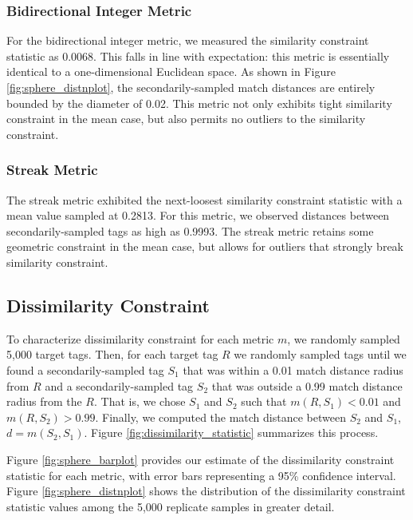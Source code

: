 \subsubsection{Bidirectional Integer Metric}

For the bidirectional integer metric, we measured the similarity constraint statistic as 0.0068.
This falls in line with expectation: this metric is essentially identical to a one-dimensional Euclidean space.
As shown in Figure \ref{fig:sphere_distnplot}, the secondarily-sampled match distances are entirely bounded by the diameter of 0.02.
This metric not only exhibits tight similarity constraint in the mean case, but also permits no outliers to the similarity constraint.

\subsubsection{Streak Metric}

The streak metric exhibited the next-loosest similarity constraint statistic with a mean value sampled at 0.2813.
For this metric, we observed distances between secondarily-sampled tags as high as 0.9993.
The streak metric retains some geometric constraint in the mean case, but allows for outliers that strongly break similarity constraint.

\subsection{Dissimilarity Constraint} \label{sec:dissimilarityconstraint}


% 

To characterize dissimilarity constraint for each metric $m$, we randomly sampled 5,000 target tags.
Then, for each target tag $R$ we randomly sampled tags until we found a secondarily-sampled tag $S_1$ that was within a 0.01 match distance radius from $R$ and a secondarily-sampled tag $S_2$ that was outside a 0.99 match distance radius from the $R$.
That is, we chose $S_1$ and $S_2$ such that $m(R, S_1) < 0.01$ and $m(R, S_2) > 0.99$.
Finally, we computed the match distance between $S_2$ and $S_1$, $d = m(S_2, S_1)$.
Figure \ref{fig:dissimilarity_statistic} summarizes this process.

Figure \ref{fig:sphere_barplot} provides our estimate of the dissimilarity constraint statistic for each metric, with error bars representing a 95\% confidence interval.
Figure \ref{fig:sphere_distnplot} shows the distribution of the dissimilarity constraint statistic values among the 5,000 replicate samples in greater detail.

